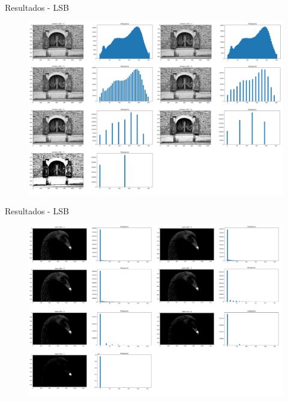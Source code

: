 \documentclass[]{beamer}
\begin{document}
\begin{frame}{Resultados - LSB}
    \begin{figure}
        \includegraphics[scale=0.16]{Imagens/resultados-shutters-lsb.png}
    \end{figure}  
\end{frame}

\begin{frame}{Resultados - LSB}
    \begin{figure}
        \includegraphics[scale=0.16]{Imagens/resultados-swan-lsb.png}
    \end{figure}  
\end{frame}
\end{document}
